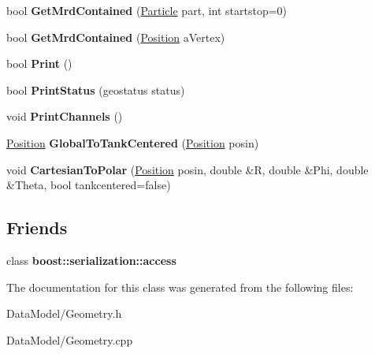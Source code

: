 \begin{DoxyCompactItemize}
\item 
\hypertarget{classGeometry_af4c8b8f5df92cf905e0ea7098ceb52ed}{bool {\bfseries Get\-Mrd\-Contained} (\hyperlink{classParticle}{Particle} part, int startstop=0)}\label{classGeometry_af4c8b8f5df92cf905e0ea7098ceb52ed}

\item 
\hypertarget{classGeometry_a9da73da227027f3592e9ef10cb06033f}{bool {\bfseries Get\-Mrd\-Contained} (\hyperlink{classPosition}{Position} a\-Vertex)}\label{classGeometry_a9da73da227027f3592e9ef10cb06033f}

\item 
\hypertarget{classGeometry_a5ddd7d7d95f76d8d711c9727824020ca}{bool {\bfseries Print} ()}\label{classGeometry_a5ddd7d7d95f76d8d711c9727824020ca}

\item 
\hypertarget{classGeometry_acf8cf2161abe0c73a4f285f66277f2cd}{bool {\bfseries Print\-Status} (geostatus status)}\label{classGeometry_acf8cf2161abe0c73a4f285f66277f2cd}

\item 
\hypertarget{classGeometry_a12b34f2e75cdee8441008d9de7e2eb1b}{void {\bfseries Print\-Channels} ()}\label{classGeometry_a12b34f2e75cdee8441008d9de7e2eb1b}

\item 
\hypertarget{classGeometry_af1ef26f91bb256a2a7d52c37f502acc7}{\hyperlink{classPosition}{Position} {\bfseries Global\-To\-Tank\-Centered} (\hyperlink{classPosition}{Position} posin)}\label{classGeometry_af1ef26f91bb256a2a7d52c37f502acc7}

\item 
\hypertarget{classGeometry_a89335cdbf640744d7e4362d8495b6859}{void {\bfseries Cartesian\-To\-Polar} (\hyperlink{classPosition}{Position} posin, double \&R, double \&Phi, double \&Theta, bool tankcentered=false)}\label{classGeometry_a89335cdbf640744d7e4362d8495b6859}

\end{DoxyCompactItemize}
\subsection*{Friends}
\begin{DoxyCompactItemize}
\item 
\hypertarget{classGeometry_ac98d07dd8f7b70e16ccb9a01abf56b9c}{class {\bfseries boost\-::serialization\-::access}}\label{classGeometry_ac98d07dd8f7b70e16ccb9a01abf56b9c}

\end{DoxyCompactItemize}


The documentation for this class was generated from the following files\-:\begin{DoxyCompactItemize}
\item 
Data\-Model/Geometry.\-h\item 
Data\-Model/Geometry.\-cpp\end{DoxyCompactItemize}
